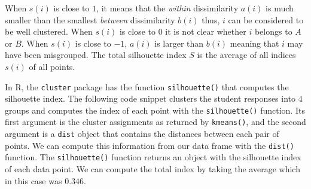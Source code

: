 \documentclass[
  11pt,
]{krantz}
\newenvironment{Shaded}{\begin{snugshade}}{\end{snugshade}}
\newcommand{\CommentTok}[1]{\textcolor[rgb]{0.37,0.37,0.37}{\textit{#1}}}
\newcommand{\DecValTok}[1]{\textcolor[rgb]{0.06,0.06,0.06}{#1}}
\newcommand{\FunctionTok}[1]{\textcolor[rgb]{0,0,0}{#1}}
\newcommand{\NormalTok}[1]{#1}
\newcommand{\OtherTok}[1]{\textcolor[rgb]{0.37,0.37,0.37}{#1}}
\newcommand{\SpecialCharTok}[1]{\textcolor[rgb]{0,0,0}{#1}}
\begin{document}
When \(s(i)\) is close to \(1\), it means that the \emph{within} dissimilarity \(a(i)\) is much smaller than the smallest \emph{between} dissimilarity \(b(i)\) thus, \(i\) can be considered to be well clustered. When \(s(i)\) is close to \(0\) it is not clear whether \(i\) belongs to \(A\) or \(B\). When \(s(i)\) is close to \(-1\), \(a(i)\) is larger than \(b(i)\) meaning that \(i\) may have been misgrouped. The total silhouette index \(S\) is the average of all indices \(s(i)\) of all points.

In R, the \texttt{cluster} package has the function \texttt{silhouette()} that computes the silhouette index. The following code snippet clusters the student responses into \(4\) groups and computes the index of each point with the \texttt{silhouette()} function. Its first argument is the cluster assignments as returned by \texttt{kmeans()}, and the second argument is a \texttt{dist} object that contains the distances between each pair of points. We can compute this information from our data frame with the \texttt{dist()} function. The \texttt{silhouette()} function returns an object with the silhouette index of each data point. We can compute the total index by taking the average which in this case was \(0.346\).

\begin{Shaded}
\end{Shaded}
\end{document}
